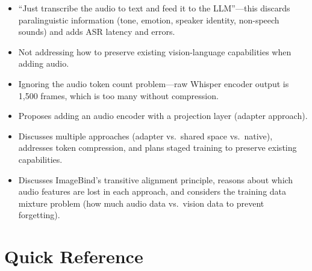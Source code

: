 \begin{interviewq}
\redflags
\begin{itemize}
    \item ``Just transcribe the audio to text and feed it to the LLM''---this discards paralinguistic information (tone, emotion, speaker identity, non-speech sounds) and adds ASR latency and errors.
    \item Not addressing how to preserve existing vision-language capabilities when adding audio.
    \item Ignoring the audio token count problem---raw Whisper encoder output is 1,500 frames, which is too many without compression.
\end{itemize}


\goodgreat
\begin{itemize}
    \item {} Proposes adding an audio encoder with a projection layer (adapter approach).
    \item {} Discusses multiple approaches (adapter vs.\ shared space vs.\ native), addresses token compression, and plans staged training to preserve existing capabilities.
    \item {} Discusses ImageBind's transitive alignment principle, reasons about which audio features are lost in each approach, and considers the training data mixture problem (how much audio data vs.\ vision data to prevent forgetting).
\end{itemize}

\end{interviewq}

\section{Quick Reference}
\label{sec:multimodal_cheatsheet}

